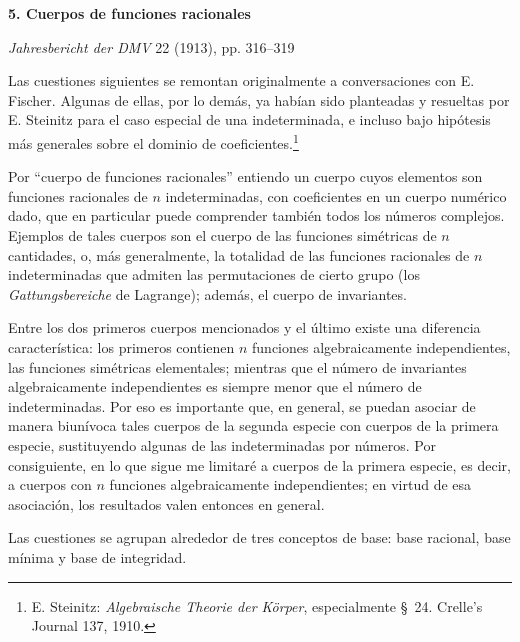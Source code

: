 \documentclass[11pt]{article}
\begin{document}
\providecommand{\Kfield}{\mathfrak{K}}
\providecommand{\Ssys}{\mathfrak{S}}
\providecommand{\Mfield}{\mathfrak{M}}
\providecommand{\tq}{\tau}
\providecommand{\Lsys}{\mathfrak{L}}
\providecommand{\Jdom}{\mathfrak{J}}
\providecommand{\ds}{\displaystyle}

\begin{center}
{\Large\bfseries 5. Cuerpos de funciones racionales}\par
\vspace{1.2em}
\emph{Jahresbericht der DMV} 22 (1913), pp. 316--319
\end{center}

\vspace{1.5em}

Las cuestiones siguientes se remontan originalmente a conversaciones con E. Fischer. Algunas de ellas, por lo demás, ya habían sido planteadas y resueltas por E. Steinitz para el caso especial de una indeterminada, e incluso bajo hipótesis más generales sobre el dominio de coeficientes.\footnote{E. Steinitz: \emph{Algebraische Theorie der Körper}, especialmente \S\ 24. Crelle's Journal 137, 1910.}

Por ``cuerpo de funciones racionales'' entiendo un cuerpo cuyos elementos son funciones racionales de $n$ indeterminadas, con coeficientes en un cuerpo numérico dado, que en particular puede comprender también todos los números complejos. Ejemplos de tales cuerpos son el cuerpo de las funciones simétricas de $n$ cantidades, o, más generalmente, la totalidad de las funciones racionales de $n$ indeterminadas que admiten las permutaciones de cierto grupo (los \emph{Gattungsbereiche} de Lagrange); además, el cuerpo de invariantes.

Entre los dos primeros cuerpos mencionados y el último existe una diferencia característica: los primeros contienen $n$ funciones algebraicamente independientes, las funciones simétricas elementales; mientras que el número de invariantes algebraicamente independientes es siempre menor que el número de indeterminadas. Por eso es importante que, en general, se puedan asociar de manera biunívoca tales cuerpos de la segunda especie con cuerpos de la primera especie, sustituyendo algunas de las indeterminadas por números. Por consiguiente, en lo que sigue me limitaré a cuerpos de la primera especie, es decir, a cuerpos con $n$ funciones algebraicamente independientes; en virtud de esa asociación, los resultados valen entonces en general.

Las cuestiones se agrupan alrededor de tres conceptos de base: base racional, base mínima y base de integridad.
\end{document}
